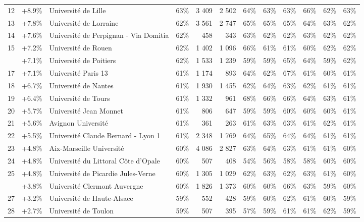 \documentclass[12pt,french,landscape]{article}
\begin{document}
\begin{longtable}{rrlrrrrrrlrr}
12 & +8.9\% & Université de Lille & 63\% & 3 409 & 2 502 & 64\% & 63\% & 63\% & 66\% & 62\% & 63\%\\
\rowcolor{gray!6}  13 & +7.8\% & Université de Lorraine & 62\% & 3 561 & 2 747 & 65\% & 65\% & 65\% & 64\% & 63\% & 62\%\\
14 & +7.6\% & Université de Perpignan - Via Domitia & 62\% & 458 & 343 & 63\% & 62\% & 62\% & 63\% & 62\% & 62\%\\
\rowcolor{gray!6}  15 & +7.2\% & Université de Rouen & 62\% & 1 402 & 1 096 & 66\% & 61\% & 61\% & 60\% & 62\% & 62\%\\
\addlinespace
16 & +7.1\% & Université de Poitiers & 62\% & 1 533 & 1 239 & 59\% & 59\% & 65\% & 64\% & 59\% & 62\%\\
\rowcolor{gray!6}  17 & +7.1\% & Université Paris 13 & 61\% & 1 174 & 893 & 64\% & 62\% & 67\% & 61\% & 60\% & 61\%\\
18 & +6.7\% & Université de Nantes & 61\% & 1 930 & 1 455 & 62\% & 64\% & 63\% & 62\% & 61\% & 61\%\\
\rowcolor{gray!6}  19 & +6.4\% & Université de Tours & 61\% & 1 332 & 961 & 68\% & 66\% & 66\% & 64\% & 63\% & 61\%\\
20 & +5.7\% & Université Jean Monnet & 61\% & 806 & 647 & 59\% & 59\% & 60\% & 60\% & 60\% & 61\%\\
\addlinespace
\rowcolor{gray!6}  21 & +5.6\% & Avignon Université & 61\% & 361 & 263 & 61\% & 63\% & 63\% & 61\% & 62\% & 61\%\\
22 & +5.5\% & Université Claude Bernard - Lyon 1 & 61\% & 2 348 & 1 769 & 64\% & 65\% & 64\% & 64\% & 61\% & 61\%\\
\rowcolor{gray!6}  23 & +4.8\% & Aix-Marseille Université & 60\% & 4 086 & 2 827 & 63\% & 64\% & 63\% & 61\% & 61\% & 60\%\\
24 & +4.8\% & Université du Littoral Côte d'Opale & 60\% & 507 & 408 & 54\% & 56\% & 58\% & 58\% & 60\% & 60\%\\
\rowcolor{gray!6}  25 & +4.8\% & Université de Picardie Jules-Verne & 60\% & 1 305 & 1 029 & 62\% & 63\% & 62\% & 63\% & 61\% & 60\%\\
\addlinespace
26 & +3.8\% & Université Clermont Auvergne & 60\% & 1 826 & 1 373 & 60\% & 60\% & 66\% & 63\% & 59\% & 60\%\\
\rowcolor{gray!6}  27 & +3.2\% & Université de Haute-Alsace & 59\% & 552 & 428 & 59\% & 60\% & 62\% & 61\% & 60\% & 59\%\\
28 & +2.7\% & Université de Toulon & 59\% & 507 & 395 & 57\% & 59\% & 61\% & 61\% & 62\% & 59\%\\

\end{longtable}
\end{document}
